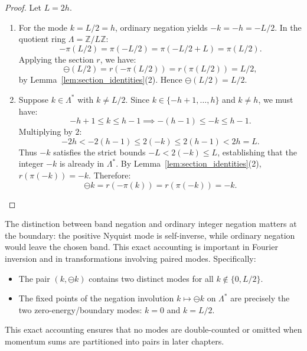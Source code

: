 \begin{proof}
Let $L = 2h$.
\begin{enumerate}
    \item For the mode $k = L/2 = h$, ordinary negation yields $-k = -h = -L/2$. In the quotient ring $\Lambda = \mathbb{Z}/L\mathbb{Z}$:
    \begin{equation}
    -\pi(L/2) = \pi(-L/2) = \pi(-L/2 + L) = \pi(L/2).
    \end{equation}
    Applying the section $r$, we have:
    \begin{equation}
    \ominus (L/2) = r(-\pi(L/2)) = r(\pi(L/2)) = L/2,
    \end{equation}
    by Lemma~\ref{lem:section_identities}(2). Hence $\ominus(L/2) = L/2$.

    \item Suppose $k \in \Lambda^*$ with $k \neq L/2$. Since $k \in \{-h+1, \dots, h\}$ and $k \neq h$, we must have:
    \begin{equation}
    -h+1 \le k \le h-1 \implies -(h-1) \le -k \le h-1.
    \end{equation}
    Multiplying by $2$:
    \begin{equation}
    -2h < -2(h-1) \le 2(-k) \le 2(h-1) < 2h = L.
    \end{equation}
    Thus $-k$ satisfies the strict bounds $-L < 2(-k) \le L$, establishing that the integer $-k$ is already in $\Lambda^*$. By Lemma~\ref{lem:section_identities}(2), $r(\pi(-k)) = -k$. Therefore:
    \begin{equation}
    \ominus k = r(-\pi(k)) = r(\pi(-k)) = -k.
    \end{equation}
\end{enumerate}
\end{proof}

\begin{remark}
The distinction between band negation and ordinary integer negation matters at the boundary: the positive Nyquist mode is self-inverse, while ordinary negation would leave the chosen band. This exact accounting is important in Fourier inversion and in transformations involving paired modes. Specifically:
\begin{itemize}
    \item The pair $(k, \ominus k)$ contains two distinct modes for all $k \notin \{0, L/2\}$.
    \item The fixed points of the negation involution $k \mapsto \ominus k$ on $\Lambda^*$ are precisely the two zero-energy/boundary modes: $k = 0$ and $k = L/2$.
\end{itemize}
This exact accounting ensures that no modes are double-counted or omitted when momentum sums are partitioned into pairs in later chapters.
\end{remark}

